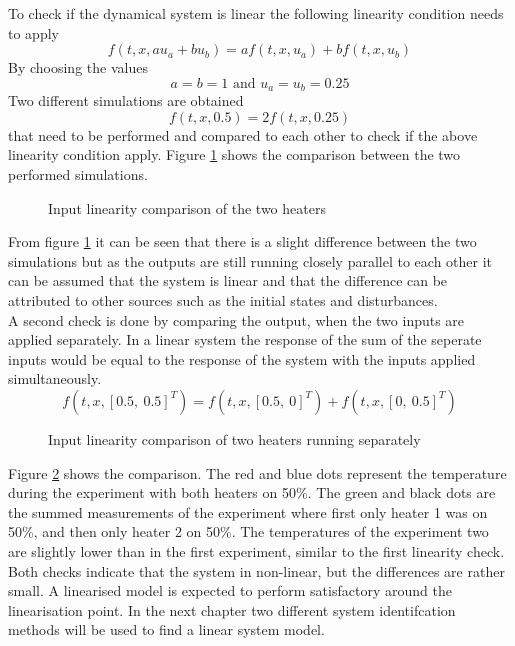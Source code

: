 To check if the dynamical system is linear the following linearity condition needs to apply
$$
f(t,x,au_a+bu_b) = af(t,x,u_a) + bf(t,x,u_b)
$$
By choosing the values 
$$
a = b = 1 \text{ and } u_a = u_b = 0.25
$$
Two different simulations are obtained
$$
f(t,x,0.5) = 2f(t,x,0.25)
$$
that need to be performed and compared to each other to check if the above linearity condition apply.
Figure \ref{fig:LinComp} shows the comparison between the two performed simulations.

\begin{figure}[ht]
    \centering
    
    \caption{Input linearity comparison of the two heaters}
    \label{fig:LinComp}
\end{figure}

From figure \ref{fig:LinComp} it can be seen that there is a slight difference between the two simulations but as the outputs are still running closely parallel to each other it can be assumed that the system is linear and that the difference can be attributed to other sources such as the initial states and disturbances.\\ 

A second check is done by comparing the output, when the two inputs are applied separately. In a linear system the response of the sum of the seperate inputs would be equal to the response of the system with the inputs applied simultaneously.
$$
f(t,x,[0.5, \ 0.5]^T) = f(t,x,[0.5, \ 0]^T) + f(t,x,[0, \ 0.5]^T)
$$
\begin{figure}[ht]
    \centering
    
    \caption{Input linearity comparison of two heaters running separately}
    \label{fig:linComp2}
\end{figure}

Figure \ref{fig:linComp2} shows the comparison. The red and blue dots represent the temperature during the experiment with both heaters on 50\%. The green and black dots are the summed measurements of the experiment where first only heater 1 was on 50\%, and then only heater 2 on 50\%. The temperatures of the experiment two are slightly lower than in the first experiment, similar to the first linearity check. \\

Both checks indicate that the system in non-linear, but the differences are rather small. A linearised model is expected to perform satisfactory around the linearisation point. In the next chapter two different system identifcation methods will be used to find a linear system model.

